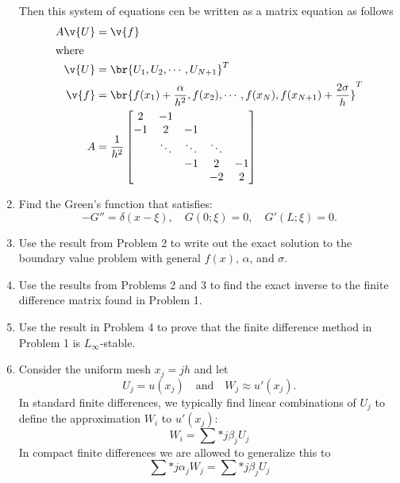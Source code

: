 \documentclass[11pt, oneside, titlepage]{article}
\begin{document}
\begin{enumerate}
        Then this system of equations cen be written as a matrix equation as follows
        \begin{align*}
            A\v{U} &= \v{f} \\
            \intertext{where}
            \v{U} &= \br{U_1, U_2, \cdots, U_{N+1}}^T \\
            \v{f} &= \br{f(x_1) + \frac{\alpha}{h^2}, f(x_2), \cdots, f(x_N), f(x_{N+1}) + \frac{2\sigma}{h}}^T \\
            A &= \frac{1}{h^2}
            \begin{bmatrix}
                 2 & -1     &        &        &    \\
                -1 &  2     & -1     &        &    \\
                   & \ddots & \ddots & \ddots &    \\
                   &        &     -1 &      2 & -1 \\
                   &        &        &     -2 &  2 \\
            \end{bmatrix}
        \end{align*}

    \item %
        Find the Green's function that satisfies:
        \[
            -G'' = \delta(x - \xi),\quad G(0;\xi) = 0,\quad G'(L;\xi) = 0.
        \]

        

    \item %
        Use the result from Problem 2 to write out the exact solution to the
        boundary value problem with general $f(x)$, $\alpha$, and $\sigma$.

    \item %
        Use the results from Problems 2 and 3 to find the exact inverse to the
        finite difference matrix found in Problem 1.

    \item %
        Use the result in Problem 4 to prove that the finite difference method
        in Problem 1 is $L_{\infty}$-stable.

    \item %
        Consider the uniform mesh $x_j = jh$ and let
        \[
            U_j = u(x_j) \quad \text{and} \quad W_j \approx u'(x_j).
        \]
        In standard finite differences, we typically find linear combinations
        of $U_j$ to define the approximation $W_i$ to $u'(x_j)$:
        \[
            W_i = \sum*{j}{}{\beta_j U_j}
        \]
        In compact finite differences we are allowed to generalize this to
        \[
            \sum*{j}{}{\alpha_j W_j} = \sum*{j}{}{\beta_j U_j}
        \]


\end{enumerate}
\end{document}
